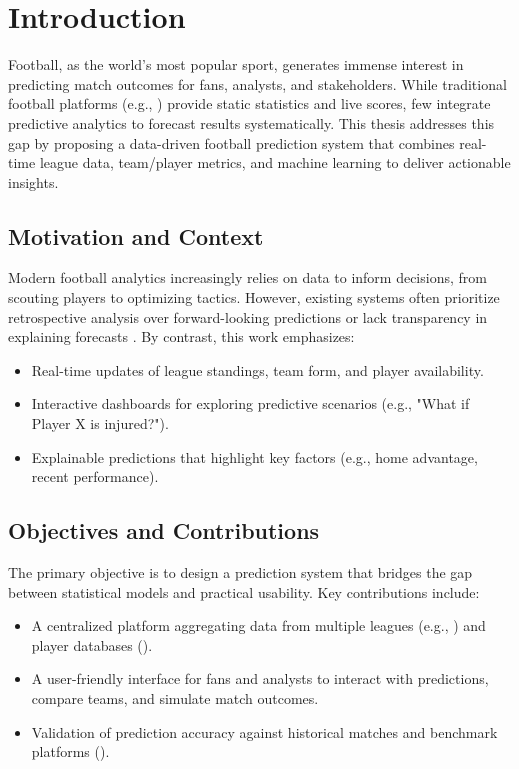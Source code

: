\chapter{Introduction}
\label{chap:introduction}

Football, as the world's most popular sport, generates immense interest in predicting match outcomes for fans, analysts, and stakeholders. While traditional football platforms (e.g., \cite{whoscored, transfermarkt}) provide static statistics and live scores, few integrate predictive analytics to forecast results systematically. This thesis addresses this gap by proposing a data-driven football prediction system that combines real-time league data, team/player metrics, and machine learning to deliver actionable insights.  

\section{Motivation and Context}
Modern football analytics increasingly relies on data to inform decisions, from scouting players to optimizing tactics. However, existing systems often prioritize retrospective analysis over forward-looking predictions or lack transparency in explaining forecasts \cite{squawka, athletic}. By contrast, this work emphasizes:  
\begin{itemize}
    \item Real-time updates of league standings, team form, and player availability.
    \item Interactive dashboards for exploring predictive scenarios (e.g., "What if Player X is injured?").
    \item Explainable predictions that highlight key factors (e.g., home advantage, recent performance).
\end{itemize}

\section{Objectives and Contributions}
The primary objective is to design a prediction system that bridges the gap between statistical models and practical usability. Key contributions include:  
\begin{itemize}
    \item A centralized platform aggregating data from multiple leagues (e.g., \cite{premier, bundesliga}) and player databases (\cite{transfermarkt}).
    \item A user-friendly interface for fans and analysts to interact with predictions, compare teams, and simulate match outcomes.
    \item Validation of prediction accuracy against historical matches and benchmark platforms (\cite{livescore, flashscore}).
\end{itemize}

